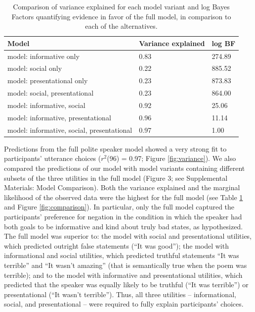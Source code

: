 \documentclass[12pt]{article}
\begin{document}
\begin{table}[tbp]
\begin{center}
\begin{threeparttable}
\caption{\label{tab:comparisonTable}Comparison of variance explained for each model variant and log Bayes Factors quantifying evidence in favor of the full model, in comparison to each of the alternatives.}
\begin{tabular}{lll}
\toprule
Model & \multicolumn{1}{c}{Variance 
explained} & \multicolumn{1}{c}{log BF}\\
\midrule
model: 
informative only & 0.83 & 274.89\\
model: 
social only & 0.22 & 885.52\\
model: 
presentational 
only & 0.23 & 873.83\\
model: 
social, 
presentational & 0.23 & 864.00\\
model: 
informative, 
social & 0.92 & 25.06\\
model: 
informative, 
presentational & 0.96 & 11.14\\
model: 
informative, 
social, 
presentational & 0.97 & 1.00\\
\bottomrule
\end{tabular}
\end{threeparttable}
\end{center}
\end{table}

Predictions from the full polite speaker model showed a very strong fit
to participants' utterance choices (\(r^2\)(96) = 0.97; Figure
\ref{fig:variance}). We also compared the predictions of our model with
model variants containing different subsets of the three utilities in
the full model (Figure 3; see Supplemental Materials: Model Comparison).
Both the variance explained and the marginal likelihood of the observed
data were the highest for the full model (see Table
\ref{tab:comparisonTable} and Figure \ref{fig:comparison}). In
particular, only the full model captured the participants' preference
for negation in the condition in which the speaker had both goals to be
informative and kind about truly bad states, as hypothesized. The full
model was superior to: the model with social and presentational
utilities, which predicted outright false statements (\enquote{It was
good}); the model with informational and social utilities, which
predicted truthful statements \enquote{It was terrible} and \enquote{It
wasn't amazing} (that is semantically true when the poem was terrible);
and to the model with informative and presentational utilities, which
predicted that the speaker was equally likely to be truthful
(\enquote{It was terrible}) or presentational (\enquote{It wasn't
terrible}). Thus, all three
utilities -- informational, social, and presentational -- were required
to fully explain participants' choices.
\end{document}
